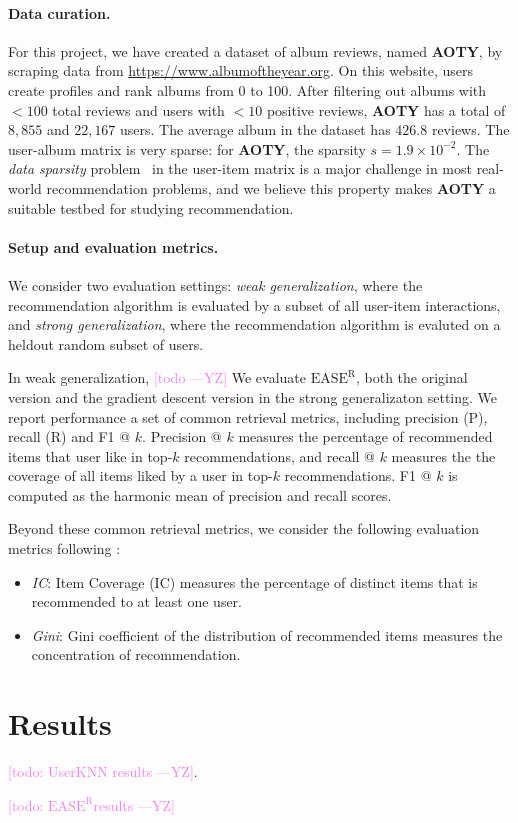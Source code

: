 \documentclass{article}
\newcommand{\aoty}{{\bf AOTY}\xspace}
\newcommand{\easer}{$\text{EASE}^\text{R}$}
\newcommand{\userknn}{UserKNN\xspace}
\newcommand{\yiming}[1]{\textcolor{violet}{[#1 ---\textsc{YZ}]}}
\begin{document}
\paragraph*{Data curation.}
For this project, we have created a dataset of album reviews, named \aoty, by
 scraping data from \url{https://www.albumoftheyear.org}.
On this website, users create profiles and rank albums from 0 to 100.
After filtering out albums with $<100$ total reviews and users with $<10$
 positive reviews, \aoty has a total of $8,855$ and $22,167$ users.
The average album in the dataset has $426.8$ reviews.
The user-album matrix is very sparse: for \aoty, the sparsity $s = 1.9 \times
	 10^{-2}$.
The {\em data sparsity} problem~\citep{suSurveyCollaborativeFiltering2009} in
 the user-item matrix is a major challenge in most real-world recommendation
 problems, and we believe this property makes \aoty a suitable testbed for
 studying recommendation.

\paragraph*{Setup and evaluation metrics.}
We consider two evaluation settings: {\em weak generalization}, where the
 recommendation algorithm is evaluated by a subset of all user-item
 interactions, and {\em strong generalization}, where the recommendation
 algorithm is evaluted on a heldout random subset of users.

In weak generalization, \yiming{todo}  We evaluate \easer, both the original
 version and the gradient descent version in the strong generalizaton setting.
We report performance a set of common retrieval metrics, including precision
 (P), recall (R) and F1 @ $k$.
Precision @ $k$ measures the percentage of recommended items that user like in
 top-$k$ recommendations, and recall @ $k$ measures the the coverage of all
 items liked by a user in top-$k$ recommendations.
F1 @ $k$ is computed as the harmonic mean of precision and recall scores.

Beyond these common retrieval metrics, we consider the following evaluation
 metrics following \citet{anelliTopNRecommendationAlgorithms2022}:
 \begin{itemize} \item {\em IC}: Item Coverage (IC) measures the percentage of
 distinct items that is recommended to at least one user.
\item {\em Gini}: Gini coefficient of the distribution of recommended items
measures the concentration of recommendation.
\end{itemize}

\section{Results}

\yiming{todo: \userknn results}.

\yiming{todo: \easer results}

\newpage


\end{document}

